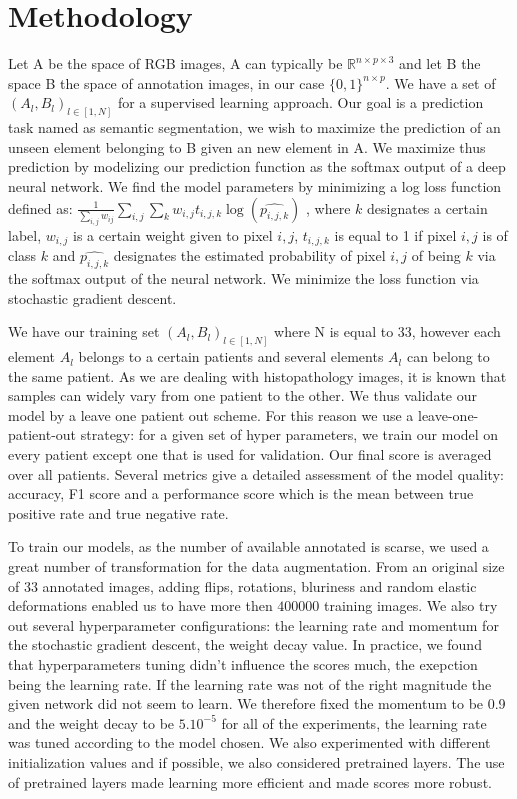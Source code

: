 \documentclass{article}
\begin{document}
\section{Methodology}
\label{sec:method}
\noindent Let A be the space of RGB images, A can typically be 
$\mathbb{R}^{n \times p \times 3}$ and let B the space B the space of annotation 
images, in our case $\{0,1\}^{n \times p}$. We have a set of 
$(A_l,B_l)_{l \in [1, N]}$ for a supervised learning approach. Our goal is 
a prediction task 
named as semantic segmentation, we wish to maximize the prediction of 
an unseen element belonging to B given an new element in A. We maximize 
thus prediction by modelizing our prediction function as the softmax output of a deep neural 
network. We find the model parameters by minimizing a log loss function 
defined as:
 $\frac{1}{\sum_{i,j}w_{ij}} \sum_{i,j} \sum_k w_{i,j} t_{i,j,k} \log (\widehat{p_{i,j,k}})$
, where $k$ designates a certain label, $w_{i,j}$ is a 
certain weight given to pixel $i,j$, $t_{i,j,k}$ is equal to 1 if pixel $i,j$ is 
of class $k$ and $\widehat{p_{i,j,k}}$ designates the estimated probability 
of pixel $i,j$ of being $k$ via the softmax output of the neural network.
We minimize the loss function via stochastic gradient descent.

We have our training set $(A_l,B_l)_{l \in [1, N]}$ where N is equal to 
33, however each element $A_l$ belongs to a certain patients and 
several elements $A_l$ can belong to the same patient. As we are 
dealing with histopathology images, it is known that samples can widely 
vary from one patient to the other. We thus validate our model by a 
leave one patient out scheme. 
For this reason we use a leave-one-patient-out strategy: for a 
given set of hyper parameters, we 
train our model on every patient except one that is used for validation. 
Our final score is averaged over all patients.
Several metrics give a detailed assessment of the model quality: accuracy, 
F1 score and a performance score which is the mean between 
true positive rate and true negative rate.

To train our models, as the number of available annotated is scarse, we 
used a great number of transformation for the data augmentation. From 
an original size of 33 annotated images, adding flips, rotations, bluriness 
and random elastic deformations enabled us to have more then 
$400 000$ training images. 
We also try out several hyperparameter configurations: the learning rate and 
momentum for the stochastic gradient descent, the weight decay value.  
In practice, we found that hyperparameters tuning didn't influence the 
scores much, the exepction being the learning rate. If the learning rate 
was not of the right magnitude the given network did not seem to learn. 
We therefore fixed the momentum to be 0.9 and the weight decay to be 
$5.10^{-5}$ for all of the experiments, the learning rate was tuned 
according to the model chosen.
We also experimented with different 
initialization values and if possible, we also considered pretrained layers. 
The use of pretrained layers made learning more efficient and made scores 
more robust.
\end{document}
